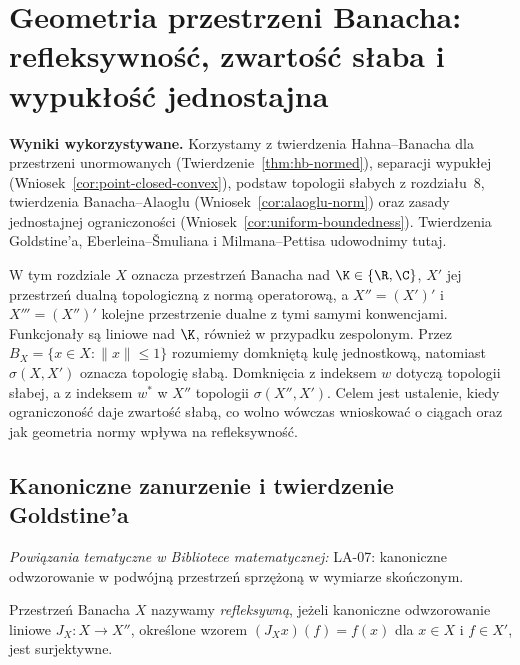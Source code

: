 \setcounter{section}{25}
\section{Geometria przestrzeni Banacha: refleksywność, zwartość słaba i wypukłość jednostajna}
\label{sec:geometria26}

\providecommand{\atlasref}[2]{#2}


\noindent\textbf{Wyniki wykorzystywane.} Korzystamy z twierdzenia
Hahna--Banacha dla przestrzeni unormowanych
(Twierdzenie~\ref{thm:hb-normed}), separacji wypukłej
(Wniosek~\ref{cor:point-closed-convex}), podstaw topologii
słabych z rozdziału~8, twierdzenia Banacha--Alaoglu
(Wniosek~\ref{cor:alaoglu-norm}) oraz zasady jednostajnej
ograniczoności (Wniosek~\ref{cor:uniform-boundedness}).
Twierdzenia Goldstine'a, Eberleina--\v Smuliana i Milmana--Pettisa
udowodnimy tutaj.
\par\medskip

W tym rozdziale $X$ oznacza przestrzeń Banacha nad $\K\in\{\R,\C\}$,
$X'$ jej przestrzeń dualną topologiczną z normą operatorową,
a $X''=(X')'$ i $X'''=(X'')'$ kolejne przestrzenie dualne
z tymi samymi konwencjami. Funkcjonały są liniowe nad $\K$,
również w przypadku zespolonym.
Przez $B_X=\{x\in X:\|x\|\le1\}$ rozumiemy domkniętą kulę
jednostkową, natomiast $\sigma(X,X')$ oznacza topologię słabą.
Domknięcia z indeksem $w$ dotyczą topologii słabej,
a z indeksem $w^\ast$ w $X''$ topologii $\sigma(X'',X')$.
Celem jest ustalenie, kiedy ograniczoność daje zwartość słabą,
co wolno wówczas wnioskować o ciągach oraz jak geometria normy
wpływa na refleksywność.

\subsection{Kanoniczne zanurzenie i twierdzenie Goldstine'a}

\noindent\emph{Powiązania tematyczne w Bibliotece matematycznej:} \atlasref{LA-07::thm:lin7-bidualnosc}{LA-07: kanoniczne odwzorowanie w podwójną przestrzeń sprzężoną w wymiarze skończonym}.


\begin{definicja}[Refleksywność]
\label{def:refleksywnosc26}
Przestrzeń Banacha $X$ nazywamy \emph{refleksywną}, jeżeli
kanoniczne odwzorowanie liniowe
$J_X:X\to X''$, określone wzorem
$(J_Xx)(f)=f(x)$ dla $x\in X$ i $f\in X'$, jest surjektywne.
\end{definicja}

